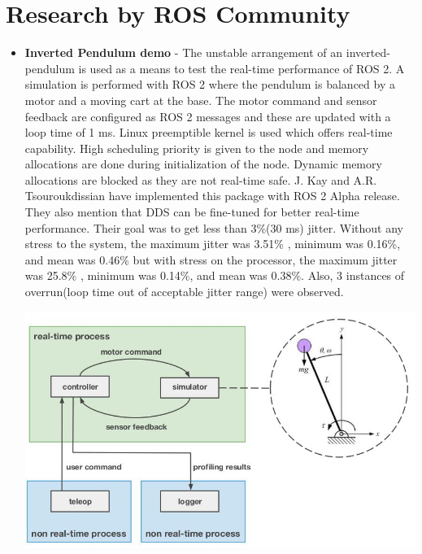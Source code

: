 \documentclass[%
xelatex,
	oneside,		%
	12pt,			%
	parskip=half,	%
	abstracton,
	chapterprefix=true%
    appendixprefix=true]
{scrbook}
\begin{document}
	\section{Research by ROS Community}
\vspace*{0.5cm}
\begin{itemize}
\item {\bfseries Inverted Pendulum demo} - The unstable arrangement of an inverted-pendulum is used as a means to test  the real-time performance of ROS 2. A simulation is performed with ROS 2 where the pendulum is balanced by a motor and a moving cart at the base. The motor command and sensor feedback are configured as ROS 2 messages and these are updated with a loop time of 1 ms. Linux preemptible kernel is used which offers real-time capability. High scheduling priority is given to the node and memory allocations are done during initialization of the node. Dynamic memory allocations are blocked as they are not real-time safe. J. Kay and A.R. Tsouroukdissian have implemented this package with ROS 2 Alpha release. They also mention that DDS can be fine-tuned for better real-time performance. Their goal was to get less than 3\%(30 ms) jitter. Without any stress to the system, the maximum jitter was 3.51\% , minimum was 0.16\%, and mean was 0.46\% but with stress on the processor, the maximum jitter was 25.8\% , minimum was 0.14\%, and mean was 0.38\%. Also, 3 instances of overrun(loop time out of acceptable jitter range) were observed.
	\begin{center}
\includegraphics[scale=0.5]{fig/inverted.jpg}


\end{center}
\end{itemize}
\end{document}

